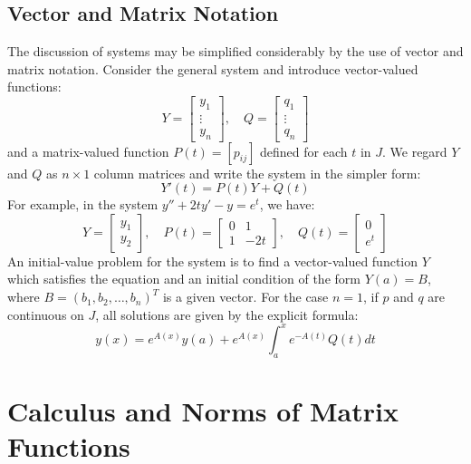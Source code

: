 \documentclass[12pt,a4paper]{report}
\theoremstyle{definition}
\numberwithin{equation}{chapter}
\begin{document}
\section{Vector and Matrix Notation}
The discussion of systems may be simplified considerably by the use of vector and matrix notation. Consider the general system and introduce vector-valued functions:
\begin{equation}
Y = \begin{bmatrix}
y_1 \\ \vdots \\ y_n
\end{bmatrix}, \quad 
Q = \begin{bmatrix}
q_1 \\ \vdots \\ q_n
\end{bmatrix}
\end{equation}
and a matrix-valued function $P(t) = [p_{ij}]$ defined for each $t$ in $J$. We regard $Y$ and $Q$ as $n \times 1$ column matrices and write the system in the simpler form:
\begin{equation}
Y'(t) = P(t)Y + Q(t)
\end{equation}
For example, in the system $y'' + 2ty' - y = e^t$, we have:
\begin{equation}
Y = \begin{bmatrix}
y_1 \\ y_2
\end{bmatrix}, \quad 
P(t) = \begin{bmatrix}
0 & 1 \\
1 & -2t
\end{bmatrix}, \quad 
Q(t) = \begin{bmatrix}
0 \\ e^t
\end{bmatrix}
\end{equation}
An initial-value problem for the system is to find a vector-valued function $Y$ which satisfies the equation and an initial condition of the form $Y(a) = B$, where $B = (b_1, b_2, \ldots, b_n)^T$ is a given vector. For the case $n = 1$, if $p$ and $q$ are continuous on $J$, all solutions are given by the explicit formula:
\begin{equation}
y(x) = e^{A(x)}y(a) + e^{A(x)} \int_a^x e^{-A(t)}Q(t)dt
\end{equation}


\chapter{Calculus and Norms of Matrix Functions}
\end{document}
